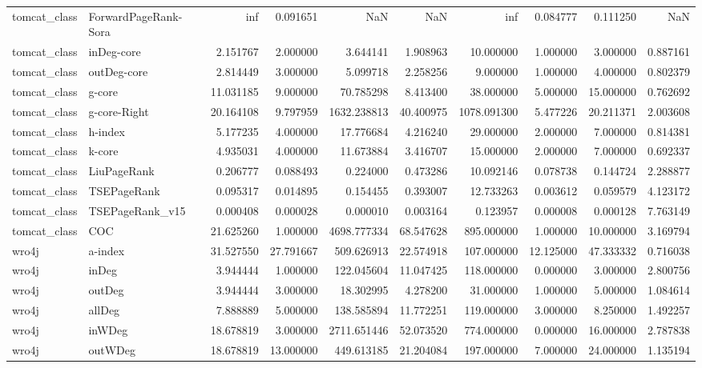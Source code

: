\begin{tabular}{llrrrrrrrr}
tomcat_class & ForwardPageRank-Sora & inf & 0.091651 & NaN & NaN & inf & 0.084777 & 0.111250 & NaN \\
tomcat_class & inDeg-core & 2.151767 & 2.000000 & 3.644141 & 1.908963 & 10.000000 & 1.000000 & 3.000000 & 0.887161 \\
tomcat_class & outDeg-core & 2.814449 & 3.000000 & 5.099718 & 2.258256 & 9.000000 & 1.000000 & 4.000000 & 0.802379 \\
tomcat_class & g-core & 11.031185 & 9.000000 & 70.785298 & 8.413400 & 38.000000 & 5.000000 & 15.000000 & 0.762692 \\
tomcat_class & g-core-Right & 20.164108 & 9.797959 & 1632.238813 & 40.400975 & 1078.091300 & 5.477226 & 20.211371 & 2.003608 \\
tomcat_class & h-index & 5.177235 & 4.000000 & 17.776684 & 4.216240 & 29.000000 & 2.000000 & 7.000000 & 0.814381 \\
tomcat_class & k-core & 4.935031 & 4.000000 & 11.673884 & 3.416707 & 15.000000 & 2.000000 & 7.000000 & 0.692337 \\
tomcat_class & LiuPageRank & 0.206777 & 0.088493 & 0.224000 & 0.473286 & 10.092146 & 0.078738 & 0.144724 & 2.288877 \\
tomcat_class & TSEPageRank & 0.095317 & 0.014895 & 0.154455 & 0.393007 & 12.733263 & 0.003612 & 0.059579 & 4.123172 \\
tomcat_class & TSEPageRank_v15 & 0.000408 & 0.000028 & 0.000010 & 0.003164 & 0.123957 & 0.000008 & 0.000128 & 7.763149 \\
tomcat_class & COC & 21.625260 & 1.000000 & 4698.777334 & 68.547628 & 895.000000 & 1.000000 & 10.000000 & 3.169794 \\
wro4j & a-index & 31.527550 & 27.791667 & 509.626913 & 22.574918 & 107.000000 & 12.125000 & 47.333332 & 0.716038 \\
wro4j & inDeg & 3.944444 & 1.000000 & 122.045604 & 11.047425 & 118.000000 & 0.000000 & 3.000000 & 2.800756 \\
wro4j & outDeg & 3.944444 & 3.000000 & 18.302995 & 4.278200 & 31.000000 & 1.000000 & 5.000000 & 1.084614 \\
wro4j & allDeg & 7.888889 & 5.000000 & 138.585894 & 11.772251 & 119.000000 & 3.000000 & 8.250000 & 1.492257 \\
wro4j & inWDeg & 18.678819 & 3.000000 & 2711.651446 & 52.073520 & 774.000000 & 0.000000 & 16.000000 & 2.787838 \\
wro4j & outWDeg & 18.678819 & 13.000000 & 449.613185 & 21.204084 & 197.000000 & 7.000000 & 24.000000 & 1.135194 \\

\end{tabular}
